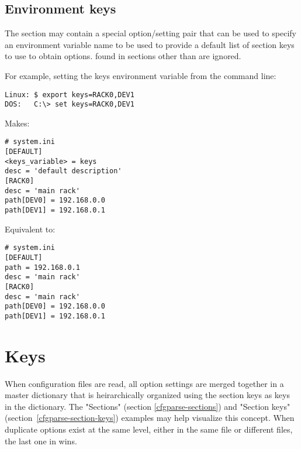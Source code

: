 \documentclass{howto}
\begin{document}
\subsection{Environment keys\label{cfgparse-env-keys}}

The \code{[DEFAULT]} section may contain a special  
option/setting pair that can be used to specify an environment variable
name to be used to provide a default list of section keys to use to obtain 
options.   found in sections other than \code{[DEFAULT]} 
are ignored.

For example, setting the keys environment variable from the command line:
\begin{verbatim}
Linux: $ export keys=RACK0,DEV1
DOS:   C:\> set keys=RACK0,DEV1
\end{verbatim}

Makes:

\begin{verbatim}
# system.ini
[DEFAULT]
<keys_variable> = keys
desc = 'default description'
[RACK0]
desc = 'main rack'
path[DEV0] = 192.168.0.0
path[DEV1] = 192.168.0.1
\end{verbatim}

Equivalent to:

\begin{verbatim}
# system.ini
[DEFAULT]
path = 192.168.0.1
desc = 'main rack'
[RACK0]
desc = 'main rack'
path[DEV0] = 192.168.0.0
path[DEV1] = 192.168.0.1
\end{verbatim}

\section{Keys\label{cfgparse-keys}}

When configuration files are read, all option settings are merged together in
a master dictionary that is heirarchically organized using the section keys
as keys in the dictionary.  The "Sections" (section \ref{cfgparse-sections}) 
and "Section keys" (section~\ref{cfgparse-section-keys}) examples may help
visualize this concept.  When duplicate options exist at the same level,
either in the same file or different files, the last one in wins.
\end{document}
